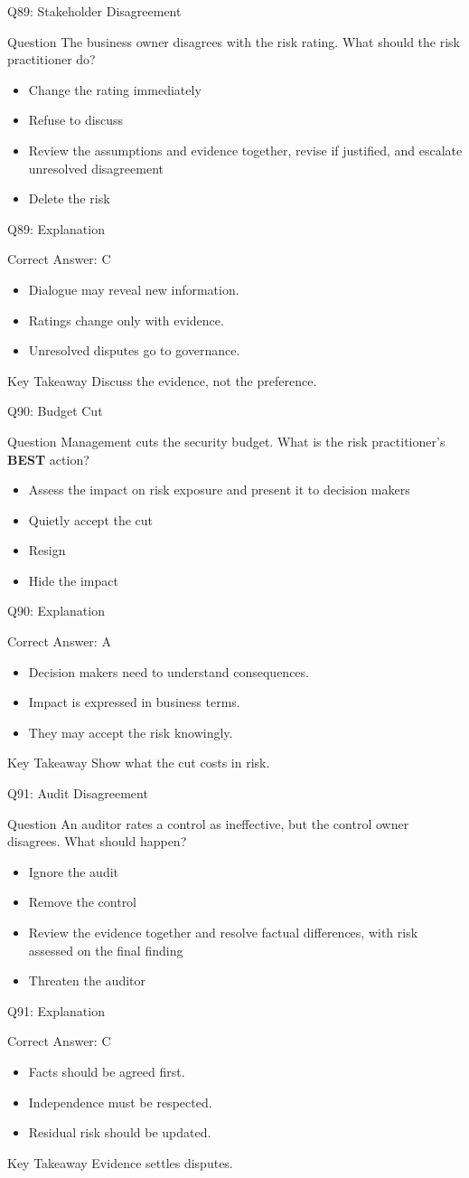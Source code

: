 \documentclass[aspectratio=169]{beamer}
\newcommand{\hq}[7]{%
	\begin{frame}{Q#1: #2}
		\begin{block}{Question}
			#3
		\end{block}
		\begin{itemize}
			#4
		\end{itemize}
	\end{frame}
	\begin{frame}{Q#1: Explanation}
		\begin{block}{Correct Answer: #5}
			\begin{itemize}
				#6
			\end{itemize}
		\end{block}
		\begin{alertblock}{Key Takeaway}
			#7
		\end{alertblock}
	\end{frame}
}
\begin{document}
	\hq{89}{Stakeholder Disagreement}
	{The business owner disagrees with the risk rating. What should the risk practitioner do?}
	{\item[\textbf{(A)}] Change the rating immediately
		\item[\textbf{(B)}] Refuse to discuss
		\item[\textbf{(C)}] Review the assumptions and evidence together, revise if justified, and escalate unresolved disagreement
		\item[\textbf{(D)}] Delete the risk}
	{C}
	{\item Dialogue may reveal new information.
		\item Ratings change only with evidence.
		\item Unresolved disputes go to governance.}
	{Discuss the evidence, not the preference.}
	
	\hq{90}{Budget Cut}
	{Management cuts the security budget. What is the risk practitioner's \textbf{BEST} action?}
	{\item[\textbf{(A)}] Assess the impact on risk exposure and present it to decision makers
		\item[\textbf{(B)}] Quietly accept the cut
		\item[\textbf{(C)}] Resign
		\item[\textbf{(D)}] Hide the impact}
	{A}
	{\item Decision makers need to understand consequences.
		\item Impact is expressed in business terms.
		\item They may accept the risk knowingly.}
	{Show what the cut costs in risk.}
	
	\hq{91}{Audit Disagreement}
	{An auditor rates a control as ineffective, but the control owner disagrees. What should happen?}
	{\item[\textbf{(A)}] Ignore the audit
		\item[\textbf{(B)}] Remove the control
		\item[\textbf{(C)}] Review the evidence together and resolve factual differences, with risk assessed on the final finding
		\item[\textbf{(D)}] Threaten the auditor}
	{C}
	{\item Facts should be agreed first.
		\item Independence must be respected.
		\item Residual risk should be updated.}
	{Evidence settles disputes.}
	
\end{document}
